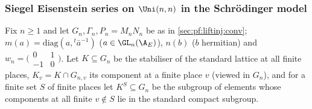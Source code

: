 \subsubsection{Siegel Eisenstein series on $\Uni(n,n)$ in the Schr\"odinger model}\label{sec:pf:liftinj:schr}

Fix $n\ge1$ and let $G_n,\Gamma_n,P_n=M_nN_n$ be as in \cref{sec:pf:liftinj:conv}; $m(a)=\mathrm{diag}(a,{}^t\bar a^{-1})$
($a\in\GL_n(\A_E)$), $n(b)$ ($b$ hermitian) and $w_n=\bigl(\begin{smallmatrix}0&1\\-1&0\end{smallmatrix}\bigr)$. Let
$K\subseteq G_n$ be the stabiliser of the standard lattice at all finite places, $K_v=K\cap G_{n,v}$ its component at a
finite place $v$ (viewed in $G_n$), and for a finite set $S$ of finite places let $K^S\subseteq G_n$ be the subgroup of
elements whose components at all finite $v\notin S$ lie in the standard compact subgroup.


